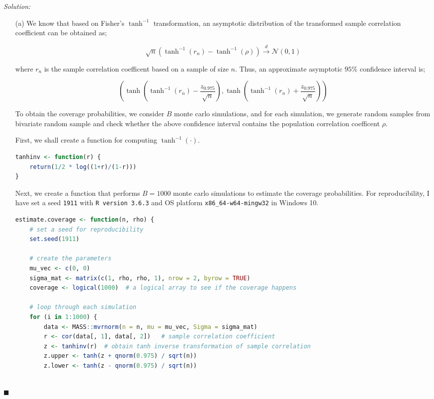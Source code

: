 \documentclass[12pt]{article}
\newcommand{\normal}{\mathcal{N}}
\theoremstyle{definition}
\newenvironment{answer}{\textit{Solution: }\quad }{ \hfill $\blacksquare$}
\numberwithin{equation}{section}
\begin{document}
\begin{answer}

    \begin{enumerate}
        \item[(a)] We know that based on Fisher's $\tanh^{-1}$ transformation, an asymptotic distribution of the transformed sample correlation coefficient can be obtained as;
    
        $$\sqrt{n}( \tanh^{-1}(r_n) - \tanh^{-1}(\rho) ) \xrightarrow{d} \normal(0, 1)$$
    
        where $r_n$ is the sample correlation coefficent based on a sample of size $n$. Thus, an approximate asymptotic $95\%$ confidence interval is;
        
        $$\left( \tanh\left( \tanh^{-1}(r_n) - \dfrac{z_{0.975}}{\sqrt{n}} \right), \tanh\left( \tanh^{-1}(r_n) + \dfrac{z_{0.975}}{\sqrt{n}} \right) \right)$$
    
        To obtain the coverage probabilities, we consider $B$ monte carlo simulations, and for each simulation, we generate random samples from bivariate random sample and check whether the above confidence interval contains the population correlation coefficent $\rho$.

        First, we shall create a function for computing $\tanh^{-1}(\cdot)$.

        \begin{lstlisting}[language = R]
tanhinv <- function(r) {
    return(1/2 * log((1+r)/(1-r)))
}\end{lstlisting}

        Next, we create a function that performs $B = 1000$ monte carlo simulations to estimate the coverage probabilities. For reproducibility, I have set a seed \texttt{1911} with \texttt{R version 3.6.3} and OS platform \texttt{x86\_64-w64-mingw32} in Windows 10.

\begin{lstlisting}[language = R]
    estimate.coverage <- function(n, rho) {
    # set a seed for reproducibility
    set.seed(1911)
    
    # create the parameters
    mu_vec <- c(0, 0)
    sigma_mat <- matrix(c(1, rho, rho, 1), nrow = 2, byrow = TRUE)
    coverage <- logical(1000)  # a logical array to see if the coverage happens
    
    # loop through each simulation
    for (i in 1:1000) {
        data <- MASS::mvrnorm(n = n, mu = mu_vec, Sigma = sigma_mat)
        r <- cor(data[, 1], data[, 2])   # sample correlation coefficient
        z <- tanhinv(r)  # obtain tanh inverse transformation of sample correlation
        z.upper <- tanh(z + qnorm(0.975) / sqrt(n))
        z.lower <- tanh(z - qnorm(0.975) / sqrt(n))
        

\end{lstlisting}
\end{enumerate}
\end{answer}
\end{document}
